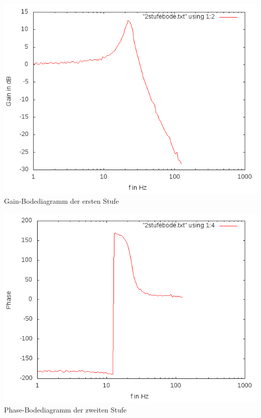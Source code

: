 \documentclass[compress,11pt]{beamer}
\begin{document}
\begin{frame}
\includegraphics[width=.7\textwidth]{4aufgabe/2stufegain}\\
Gain-Bodediagramm der ersten Stufe
\end{frame}
\begin{frame}
\includegraphics[width=.7\textwidth]{4aufgabe/2stufephase}\\
Phase-Bodediagramm der zweiten Stufe
\end{frame}
\end{document}
